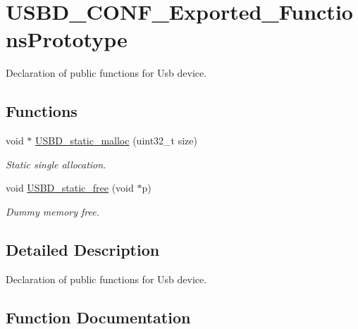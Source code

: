 \hypertarget{group__USBD__CONF__Exported__FunctionsPrototype}{}\section{U\+S\+B\+D\+\_\+\+C\+O\+N\+F\+\_\+\+Exported\+\_\+\+Functions\+Prototype}
\label{group__USBD__CONF__Exported__FunctionsPrototype}


Declaration of public functions for Usb device.  


\subsection*{Functions}
\begin{DoxyCompactItemize}
\item 
void $\ast$ \hyperlink{group__USBD__CONF__Exported__FunctionsPrototype_ga2df01b9aae6026e9f6b55da3b1e72aee}{U\+S\+B\+D\+\_\+static\+\_\+malloc} (uint32\+\_\+t size)
\begin{DoxyCompactList}\small\item\em Static single allocation. \end{DoxyCompactList}\item 
void \hyperlink{group__USBD__CONF__Exported__FunctionsPrototype_ga92ed1214efe53f54b3586a6233cfa5a6}{U\+S\+B\+D\+\_\+static\+\_\+free} (void $\ast$p)
\begin{DoxyCompactList}\small\item\em Dummy memory free. \end{DoxyCompactList}\end{DoxyCompactItemize}


\subsection{Detailed Description}
Declaration of public functions for Usb device. 



\subsection{Function Documentation}
\mbox{\label{group__USBD__CONF__Exported__FunctionsPrototype_ga92ed1214efe53f54b3586a6233cfa5a6}} 
